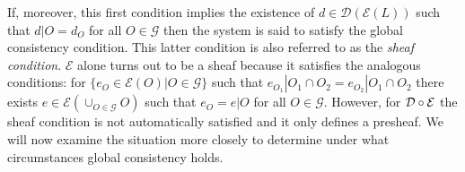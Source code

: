 If, moreover, this first condition implies the existence of $d \in \mathcal{D}( \mathcal{E}(L))$ such that $d|O = d_O$ for all $O \in \mathcal{G}$ then the system is said to satisfy the global consistency condition.  This latter condition is also referred to as the \emph{sheaf condition}.  $\mathcal{E}$ alone turns out to be a sheaf because it satisfies the analogous conditions: for $\{e_O \in \mathcal{E}(O) | O \in \mathcal{G}\}$ such that $e_{O_{1}} | O_1 \cap O_2 = e_{O_{2}} | O_1 \cap O_2$ there exists $e \in \mathcal{E}(\cup_{O \in \mathcal{G}} O)$ such that $e_O = e|O$ for all $O \in \mathcal{G}$.  However, for $\mathcal{D} \circ \mathcal{E}$ the sheaf condition is not automatically satisfied and it only defines a presheaf.  We will now examine the situation more closely to determine under what circumstances global consistency holds.

